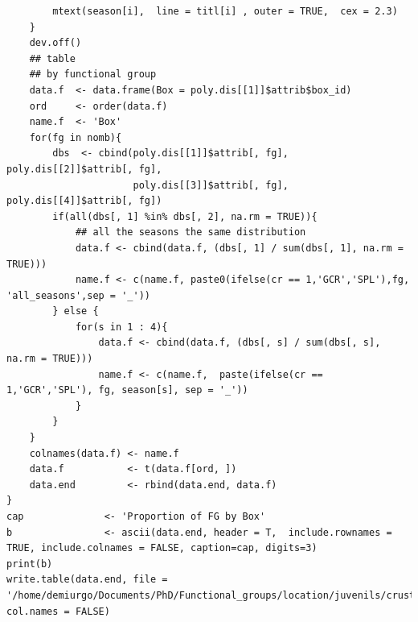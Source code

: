 \documentclass[11pt]{article}
\begin{document}
\begin{itemize}
\begin{itemize}
\begin{itemize}
\begin{verbatim}
        mtext(season[i],  line = titl[i] , outer = TRUE,  cex = 2.3)
    }
    dev.off()
    ## table
    ## by functional group
    data.f  <- data.frame(Box = poly.dis[[1]]$attrib$box_id)
    ord     <- order(data.f)
    name.f  <- 'Box'
    for(fg in nomb){
        dbs  <- cbind(poly.dis[[1]]$attrib[, fg], poly.dis[[2]]$attrib[, fg],
                      poly.dis[[3]]$attrib[, fg], poly.dis[[4]]$attrib[, fg])
        if(all(dbs[, 1] %in% dbs[, 2], na.rm = TRUE)){
            ## all the seasons the same distribution
            data.f <- cbind(data.f, (dbs[, 1] / sum(dbs[, 1], na.rm = TRUE)))
            name.f <- c(name.f, paste0(ifelse(cr == 1,'GCR','SPL'),fg, 'all_seasons',sep = '_'))
        } else {
            for(s in 1 : 4){
                data.f <- cbind(data.f, (dbs[, s] / sum(dbs[, s], na.rm = TRUE)))
                name.f <- c(name.f,  paste(ifelse(cr == 1,'GCR','SPL'), fg, season[s], sep = '_'))
            }
        }
    }
    colnames(data.f) <- name.f
    data.f           <- t(data.f[ord, ])
    data.end         <- rbind(data.end, data.f)
}
cap              <- 'Proportion of FG by Box'
b                <- ascii(data.end, header = T,  include.rownames = TRUE, include.colnames = FALSE, caption=cap, digits=3)
print(b)
write.table(data.end, file = '/home/demiurgo/Documents/PhD/Functional_groups/location/juvenils/crustacean/Crus_dist_fin.csv', col.names = FALSE)
\end{verbatim}


\end{itemize}
\end{itemize}
\end{itemize}
\end{document}
